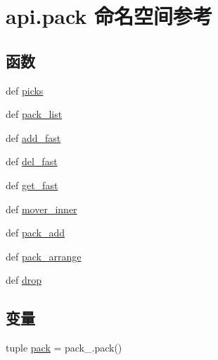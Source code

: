 \hypertarget{namespaceapi_1_1pack}{\section{api.\-pack 命名空间参考}
\label{namespaceapi_1_1pack}
}
\subsection*{函数}
\begin{DoxyCompactItemize}
\item 
def \hyperlink{namespaceapi_1_1pack_ab6b54f30a116993db8d6ea772822ae0d}{picks}
\item 
def \hyperlink{namespaceapi_1_1pack_a9f1424664f9c3b003da1077bc3bf1cc4}{pack\-\_\-list}
\item 
def \hyperlink{namespaceapi_1_1pack_a65100890662612778b52dd84d153dafd}{add\-\_\-fast}
\item 
def \hyperlink{namespaceapi_1_1pack_acff16cc1d358a4eb91be62f989dcc6dd}{del\-\_\-fast}
\item 
def \hyperlink{namespaceapi_1_1pack_abfe7466b92a3b2a6c91c8211b11a0bcb}{get\-\_\-fast}
\item 
def \hyperlink{namespaceapi_1_1pack_abd6a8a5e0ed26ebc489aa6ab6a788571}{mover\-\_\-inner}
\item 
def \hyperlink{namespaceapi_1_1pack_a292d61a9581a330c85a557ab0101a919}{pack\-\_\-add}
\item 
def \hyperlink{namespaceapi_1_1pack_a6c049c6fa5fbb79bbb07e4af6a314eaf}{pack\-\_\-arrange}
\item 
def \hyperlink{namespaceapi_1_1pack_ad27bc1994b2de1834b9144ad3557320f}{drop}
\end{DoxyCompactItemize}
\subsection*{变量}
\begin{DoxyCompactItemize}
\item 
tuple \hyperlink{namespaceapi_1_1pack_aa51273a8afd491941b18fd6eb2629bab}{pack} = pack\-\_\-.\-pack()
\end{DoxyCompactItemize}


